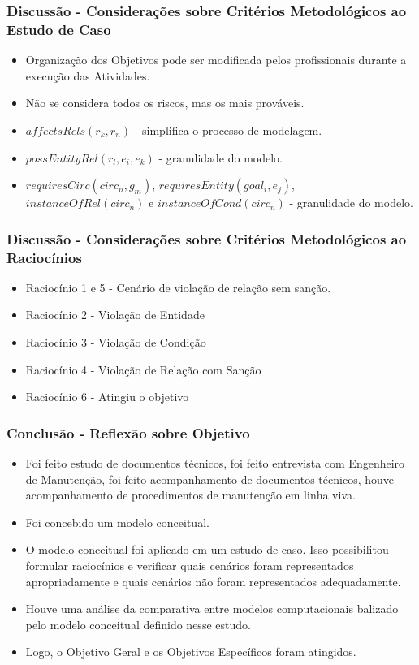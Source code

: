 \documentclass{beamer}
\begin{document}
\begin{frame}
	\frametitle{Discussão - Considerações sobre Critérios Metodológicos ao Estudo de Caso}
	\begin{itemize}
		\item Organização dos Objetivos pode ser modificada pelos profissionais durante a execução das Atividades.		
		\item Não se considera todos os riscos, mas os mais prováveis.
		\item $affectsRels(r_k,r_n)$ - simplifica o processo de modelagem.
		\item $possEntityRel(r_l,e_i,e_k)$ - granulidade do modelo.
		\item $requiresCirc(circ_n,g_m)$, $requiresEntity(goal_i, e_j)$, $instanceOfRel(circ_n)$ e $instanceOfCond(circ_n)$ - granulidade do modelo. 
	\end{itemize}
\end{frame}

\begin{frame}
	\frametitle{Discussão - Considerações sobre Critérios Metodológicos ao Raciocínios}
	\begin{itemize}
		\item Raciocínio 1 e 5  - Cenário de violação de relação sem sanção.  
		\item Raciocínio 2 - Violação de Entidade 
		\item Raciocínio 3 - Violação de Condição
		\item Raciocínio 4 - Violação de Relação com Sanção
		\item Raciocínio 6 - Atingiu o objetivo
	\end{itemize}
\end{frame}


\begin{frame}
	\frametitle{Conclusão - Reflexão sobre Objetivo}
	\begin{itemize} 
		\item Foi feito estudo de documentos técnicos, foi feito entrevista com Engenheiro de Manutenção, foi feito acompanhamento de documentos técnicos, houve acompanhamento de procedimentos de manutenção em linha viva.
		\item Foi concebido um modelo conceitual.
		\item O modelo conceitual foi aplicado em um estudo de caso. Isso possibilitou formular raciocínios e verificar quais cenários foram representados apropriadamente e quais cenários não foram representados adequadamente.
		\item Houve uma análise da comparativa entre modelos computacionais balizado pelo modelo conceitual definido nesse estudo.
		\item Logo, o Objetivo Geral e os Objetivos Específicos foram atingidos.    
	\end{itemize}
\end{frame}
\end{document}
